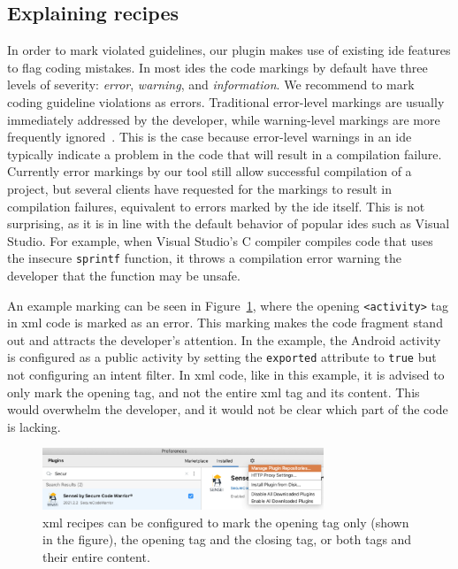 \subsection{Explaining recipes}
\label{sec:information}
In order to mark violated guidelines, our plugin makes use of existing \gls{ide} features to flag coding mistakes.
In most \glspl{ide} the code markings by default have three levels of severity: \emph{error}, \emph{warning}, and \emph{information}.
We recommend to mark coding guideline violations as errors.
Traditional error-level markings are usually immediately addressed by the developer, while warning-level markings are more frequently ignored~\cite{whitney2018embedding}.
This is the case because error-level warnings in an \gls{ide} typically indicate a problem in the code that will result in a compilation failure.
Currently error markings by our tool still allow successful compilation of a project, but several clients have requested for the markings to result in compilation failures, equivalent to errors marked by the \gls{ide} itself.
This is not surprising, as it is in line with the default behavior of popular \glspl{ide} such as Visual Studio.
For example, when Visual Studio's C compiler compiles code that uses the insecure \texttt{sprintf} function, it throws a compilation error warning the developer that the function may be unsafe.

An example marking can be seen in Figure~\ref{fig:publicactivity}, where the opening \texttt{<activity>} tag in \gls{xml} code is marked as an error.
This marking makes the code fragment stand out and attracts the developer's attention.
In the example, the Android activity is configured as a public activity by setting the \texttt{exported} attribute to \texttt{true} but not configuring an intent filter.
In \gls{xml} code, like in this example, it is advised to only mark the opening tag, and not the entire \gls{xml} tag and its content.
This would overwhelm the developer, and it would not be clear which part of the code is lacking. 

\begin{figure}
  \centering
  \includegraphics[width=0.75\textwidth,page=3]{04-tools/figures/figures2.pdf}
  \caption[Error marking on an XML opening tag.]{\Gls{xml} recipes can be configured to mark the opening tag only (shown in the figure), the opening tag and the closing tag, or both tags and their entire content.}
  \label{fig:publicactivity} 
\end{figure}

